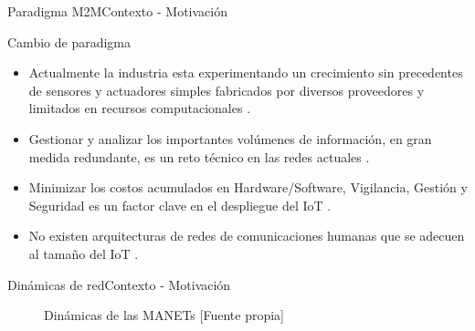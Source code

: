 \begin{frame}{Paradigma M2M}{Contexto - Motivación}
\begin{block}{Cambio de paradigma}
  \begin{itemize}
    \justifying
    \item<1-|alert@1> Actualmente la industria esta experimentando un crecimiento sin precedentes de sensores y actuadores simples fabricados por diversos proveedores y limitados en recursos computacionales \cite{M2MARCHITECTUREPERFORMANCE}. 
    \item<2-|alert@2> Gestionar y analizar los importantes volúmenes de información, en gran medida redundante, es un reto técnico en las redes actuales \cite{IOTIPV6MIPV6}.
    \item<3-|alert@3> Minimizar los costos acumulados en Hardware/Software, Vigilancia, Gestión y Seguridad es un factor clave en el despliegue del IoT \cite{RethinkIOT}.
    \item<4-|alert@4> No existen arquitecturas de redes de comunicaciones humanas que se adecuen al tamaño del IoT \cite{RethinkIOT}. 
  \end{itemize}
 \end{block}
\end{frame}
\begin{frame}{Dinámicas de red}{Contexto - Motivación}
    \begin{figure}[htbp]
	    \centering
	    \caption{Dinámicas de las MANETs [Fuente propia]}
	    \label{fig:DinMan}
    \end{figure}
\end{frame}
